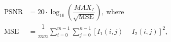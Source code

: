 \begin{align} 
    \text{PSNR} &= 20 \cdot \log_{10}\left(\dfrac{MAX_I}{\sqrt{\text{MSE}}}\right) \label{eq:psnr}, \ \text{where} \\ 
    \text{MSE} &= \dfrac{1}{m n} \sum_{i = 0}^{m-1} \sum_{j = 0}^{n-1} \left[I_1(i,j) - I_2(i, j) \right]^2, \label{eq:mse}
\end{align}